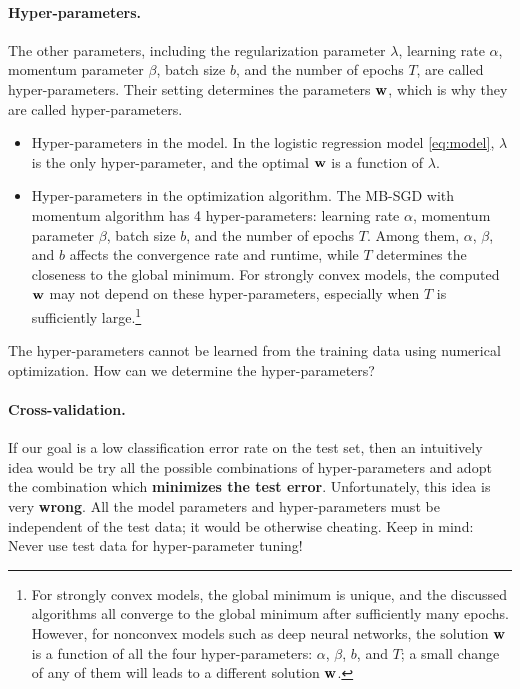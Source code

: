 \documentclass[11pt]{article}
\numberwithin{equation}{section}
\def\w{{\bf w}}
\begin{document}
\paragraph{Hyper-parameters.}
The other parameters, including the regularization parameter $\lambda$, learning rate $\alpha$, momentum parameter $\beta$, batch size $b$, and the number of epochs $T$, are called hyper-parameters.
Their setting determines the parameters $\w$, which is why they are called hyper-parameters.
\begin{itemize}
	\item 
	Hyper-parameters in the model.
	In the logistic regression model \eqref{eq:model},
	$\lambda$ is the only hyper-parameter,
	and the optimal $\w$ is a function of $\lambda$.
	\item
	Hyper-parameters in the optimization algorithm.
	The MB-SGD with momentum algorithm has 4 hyper-parameters:
	learning rate $\alpha$, momentum parameter $\beta$, batch size $b$, and the number of epochs $T$.
	Among them, $\alpha$, $\beta$, and $b$ affects the convergence rate and runtime, 
	while $T$ determines the closeness to the global minimum.
	For strongly convex models, the computed $\w$ may not depend on these hyper-parameters, especially when $T$ is sufficiently large.\footnote{For strongly convex models, the global minimum is unique, and the discussed algorithms all converge to the global minimum after sufficiently many epochs.
		However, for nonconvex models such as deep neural networks, the solution $\w$ is a function of all the four hyper-parameters: $\alpha$, $\beta$, $b$, and $T$; a small change of any of them will leads to a different solution $\w$.}
\end{itemize}
The hyper-parameters cannot be learned from the training data using numerical optimization.
How can we determine the hyper-parameters?




\paragraph{Cross-validation.}
If our goal is a low classification error rate on the test set, 
then an intuitively idea would be try all the possible combinations of hyper-parameters and adopt the combination which {\bf minimizes the test error}.
Unfortunately, this idea is very \textbf{wrong}.
All the model parameters and hyper-parameters must be independent of the test data; it would be otherwise cheating.
Keep in mind: Never use test data for hyper-parameter tuning!
\end{document}

